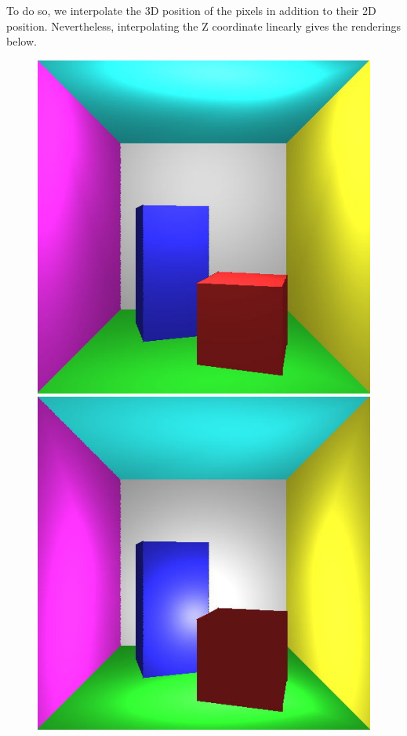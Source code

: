 To do so, we interpolate the 3D position of the pixels in addition to their 2D position. Nevertheless, interpolating the Z coordinate linearly gives the renderings below.

\begin{figure}[H]
    \centering
    \includegraphics[width=\linewidth]{img/interpolated_pos1.jpg}
\endminipage
{}
    \centering
    \includegraphics[width=\linewidth]{img/interpolated_pos2.jpg}

\end{figure}
